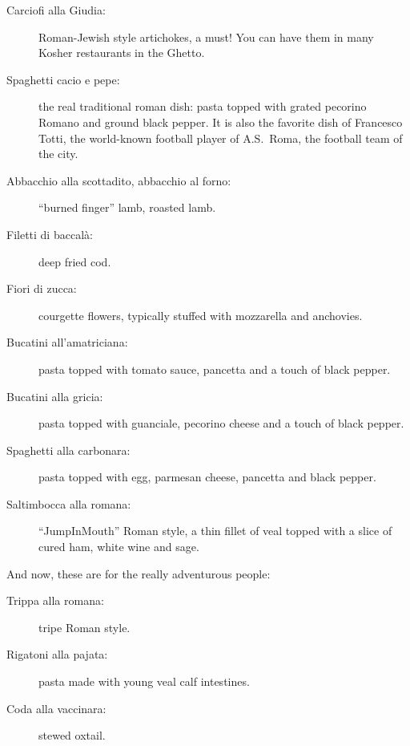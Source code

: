 \documentclass[twocolumn,10pt]{article}
\begin{document}
\begin{description}

\item[Carciofi alla Giudia:] Roman-Jewish style artichokes, a must! 
You can have them in many Kosher restaurants in the Ghetto.

\item[Spaghetti cacio e pepe:] the real traditional roman dish:
pasta topped with grated pecorino Romano and ground black pepper.
It is also the favorite dish of Francesco Totti, the world-known
football player of A.S.~Roma, the football team of the
city.


\item[Abbacchio alla scottadito, abbacchio al forno:] ``burned 
finger'' lamb, roasted lamb.

\item[Filetti di baccal\`a:] deep fried cod.

\item[Fiori di zucca:] courgette flowers, typically stuffed with 
mozzarella and anchovies.


\item[Bucatini all'amatriciana:] pasta topped with tomato sauce, 
pancetta and a touch of black pepper.

\item[Bucatini alla gricia:] pasta topped with  
guanciale, pecorino cheese and a touch of black pepper. 
\item[Spaghetti alla carbonara:] pasta topped with egg, parmesan 
cheese, pancetta and black pepper.

\item[Saltimbocca alla romana:]  ``JumpInMouth'' Roman style, a thin 
fillet of veal topped with a slice of cured ham, white wine and sage.

\end{description}



\noindent And now, these are for the really adventurous people:

\vspace{-1mm}

\begin{description}

\item[Trippa alla romana:] tripe Roman style.

\vspace{-1mm}

\item[Rigatoni alla pajata:] pasta made with young veal calf 
intestines.

\vspace{-1mm}

\item[Coda alla vaccinara:] stewed oxtail.

\end{description}
\end{document}
